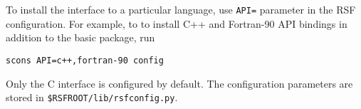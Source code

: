 To install the interface to a particular language, use \texttt{API=}
parameter in the RSF configuration. For example, to to install C++ and
Fortran-90 API bindings in addition to the basic package, run
\begin{verbatim}
scons API=c++,fortran-90 config
\end{verbatim}
Only the C interface is configured by default. The configuration
parameters are stored in \texttt{\$RSFROOT/lib/rsfconfig.py}.

 

